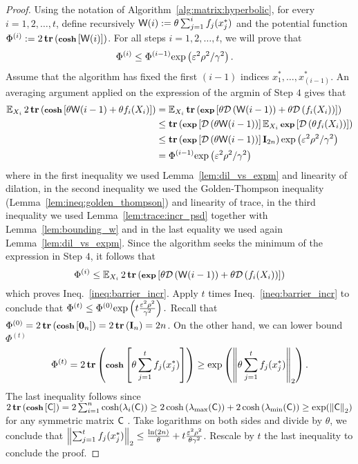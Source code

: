 \begin{proof}
Using the notation of Algorithm~\ref{alg:matrix:hyperbolic}, for every $i=1,2,\ldots , t$, define recursively ${\mathsf{W} }(i) := \theta \sum_{j=1}^{i} f_j(x_j^*)$ and the potential function $\Phi^{(i)} := 2\operatorname{\textbf{tr}}\left(\operatorname{\textbf{\footnotesize cosh}}\left[{\mathsf{W} }(i)\right]\right)$. For all steps $i=1,2,\ldots , t$, we will prove that
\begin{align}\label{ineq:barrier_incr}
  \Phi^{(i)}   & \leq  \Phi^{(i-1)} \hbox{\textrm exp}\left( \varepsilon^2 \rho^2/\gamma^2  \right).
\end{align}
%
Assume that the algorithm has fixed the first $(i-1)$ indices $x_1^*,\ldots ,x_{(i-1)}^* $. An averaging argument applied on the expression of the argmin of Step $4$ gives that
%
%
\begin{align*}
\operatorname{\mathbb{E}}_{X_i}  2\operatorname{\textbf{tr}}\left(\operatorname{\textbf{\footnotesize cosh}}\left[ \theta  {\ensuremath{\mathsf{W} }}(i - 1) + \theta  f_i(X_i)\right]\right) &   =  \operatorname{\mathbb{E}}_{X_i}  \operatorname{\textbf{tr}}\left(\operatorname{\textbf{\footnotesize exp}}\left[ \theta \mathcal{D}\left( {\mathsf{W} }(i - 1)\right) + \theta \mathcal{D}\left( f_i(X_i)\right) \right]\right) \\
                                                                   & \leq    \operatorname{\textbf{tr}}\left(\operatorname{\textbf{\footnotesize exp}}\left[ \mathcal{D}\left(\theta {\ensuremath{\mathsf{W} }}(i - 1)\right)\right] \operatorname{\mathbb{E}}_{X_i} \operatorname{\textbf{\footnotesize exp}}\left[\mathcal{D}\left( \theta f_i(X_i)\right) \right]\right) \\
                                                                   & \leq   \operatorname{\textbf{tr}}\left(\operatorname{\textbf{\footnotesize exp}}\left[ \mathcal{D}\left(\theta {\ensuremath{\mathsf{W} }}(i - 1)\right)\right]  \mathbf{I}_{2n}\right) \hbox{\textrm exp}\left( \varepsilon^2 \rho^2 / \gamma^2 \right) \\
                                                                   &   =    \Phi^{(i-1)} \hbox{\textrm exp}\left( \varepsilon^2 \rho^2 / \gamma^2 \right)
\end{align*}
%
where in the first inequality we used Lemma~\ref{lem:dil_vs_expm} and linearity of dilation, in the second inequality we used the Golden-Thompson inequality (Lemma~\ref{lem:ineq:golden_thompson}) and linearity of trace, in the third inequality we used Lemma~\ref{lem:trace:incr_psd} together with Lemma~\ref{lem:bounding_w} and in the last equality we used again Lemma~\ref{lem:dil_vs_expm}. Since the algorithm seeks the minimum of the expression in Step $4$, it follows that
\[\Phi^{(i)} \leq \operatorname{\mathbb{E}}_{X_i}  2\operatorname{\textbf{tr}}\left(\operatorname{\textbf{\footnotesize exp}}\left[ \theta \mathcal{D}\left( {\mathsf{W} }(i-1)\right) + \theta \mathcal{D}\left( f_i(X_i)\right) \right]\right)\]
which proves Ineq.~\eqref{ineq:barrier_incr}. Apply $t$ times Ineq.~\eqref{ineq:barrier_incr} to conclude that $\Phi^{(t)} \leq \Phi^{(0)} \hbox{\textrm exp}\left( t\frac{\varepsilon^2 \rho^2}{ \gamma^2} \right).$
%
Recall that $\Phi^{(0)} = 2\operatorname{\textbf{tr}}\left(\operatorname{\textbf{\footnotesize cosh}}\left[\mathbf{0}_n\right]\right) = 2\operatorname{\textbf{tr}}\left(\mathbf{I}_n \right)  = 2n$. On the other hand, we can lower bound $\Phi^{(t)}$
%
\[\Phi^{(t)} = 2\operatorname{\textbf{tr}}\left(\operatorname{\textbf{\footnotesize cosh}}\left[\theta \sum_{j=1}^{t}  f_j(x_j^*)\right] \right)  \geq \hbox{\textrm exp}\left(\left\| \theta \sum_{j=1}^{t}  f_j(x_j^*)  \right\|_2\right). \]
%
The last inequality follows since $2\operatorname{\textbf{tr}}\left(\operatorname{\textbf{\footnotesize cosh}}\left[ {\mathsf{C} }\right]\right) = 2\sum_{i=1}^{n} \cosh ( \lambda_i ( {\mathsf{C} } )) \geq 2\cosh\left(\lambda_{\max}( {\mathsf{C} } )\right) + 2\cosh\left( \lambda_{\min}({\mathsf{C} })\right)  \geq \hbox{\textrm exp} (\left\|{\mathsf{C} }\right\|_2)$ for any symmetric matrix ${\mathsf{C} }$ . Take logarithms on both sides and divide by $\theta$, we conclude that $\left\| \sum_{j=1}^{t}  f_j(x_j^*) \right\|_2 \leq \frac{\ln (2n)}{\theta} + t\frac{\varepsilon^2 \rho^2}{\theta \gamma^2}$.
%
Rescale by $t$ the last inequality to conclude the proof.
%
%
\end{proof}
